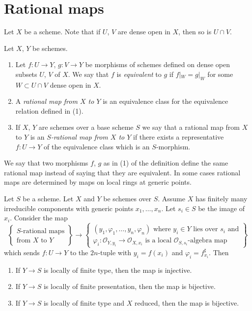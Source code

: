 \section{Rational maps}
\label{section-rational-maps}

\noindent
Let $X$ be a scheme. Note that if $U$, $V$ are dense open
in $X$, then so is $U \cap V$.

\begin{definition}
\label{definition-rational-map}
Let $X$, $Y$ be schemes.
\begin{enumerate}
\item Let $f : U \to Y$, $g : V \to Y$ be morphisms of schemes defined
on dense open subsets $U$, $V$ of $X$. We say that $f$ is
{\it equivalent} to $g$ if $f|_W = g|_W$ for some $W \subset U \cap V$
dense open in $X$.
\item A {\it rational map from $X$ to $Y$}
is an equivalence class for the equivalence relation defined in (1).
\item If $X$, $Y$ are schemes over a base scheme $S$ we say that
a rational map from $X$ to $Y$ is an {\it $S$-rational map from $X$
to $Y$} if there exists a representative $f : U \to Y$ of the equivalence
class which is an $S$-morphism.
\end{enumerate}
\end{definition}

\noindent
We say that two morphisms $f$, $g$ as in (1) of the definition
define the same rational map instead of saying that they are equivalent.
In some cases rational maps are determined by maps on local rings
at generic points.

\begin{lemma}
\label{lemma-rational-map-finite-presentation}
Let $S$ be a scheme. Let $X$ and $Y$ be schemes over $S$. Assume $X$ has
finitely many irreducible components with generic points
$x_1, \ldots, x_n$. Let $s_i \in S$ be the image of $x_i$.
Consider the map
$$
\left\{
\begin{matrix}
S\text{-rational maps} \\
\text{from }X\text{ to }Y
\end{matrix}
\right\}
\longrightarrow
\left\{
\begin{matrix}
(y_1, \varphi_1, \ldots, y_n, \varphi_n)\text{ where }
y_i \in Y\text{ lies over }s_i\text{ and}\\
\varphi_i : \mathcal{O}_{Y, y_i} \to \mathcal{O}_{X, x_i}
\text{ is a local }\mathcal{O}_{S, s_i}\text{-algebra map}
\end{matrix}
\right\}
$$
which sends $f : U \to Y$ to the $2n$-tuple with
$y_i = f(x_i)$ and $\varphi_i = f^\sharp_{x_i}$. Then
\begin{enumerate}
\item If $Y \to S$ is locally of finite type, then the map is injective.
\item If $Y \to S$ is locally of finite presentation, then the map is bijective.
\item If $Y \to S$ is locally of finite type and $X$ reduced,
then the map is bijective.
\end{enumerate}
\end{lemma}

